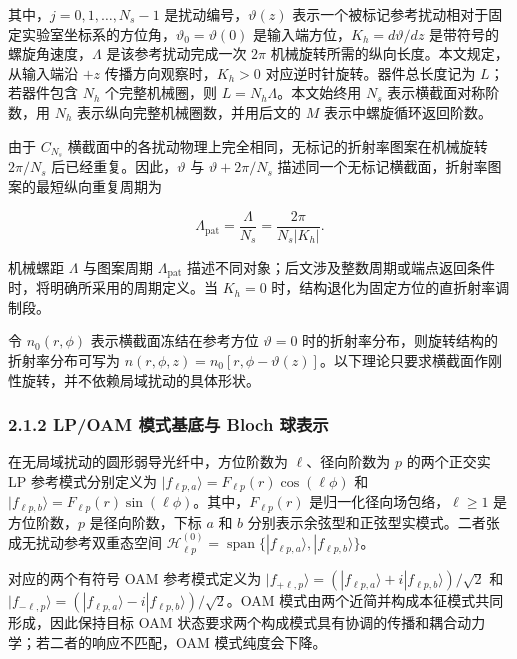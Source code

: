 \documentclass[
  UTF8,
  zihao=-4,
  fontset=fandol]{ctexart}
\begin{document}
其中，\(j=0,1,\ldots,N_s-1\) 是扰动编号，\(\vartheta(z)\)
表示一个被标记参考扰动相对于固定实验室坐标系的方位角，\(\vartheta_0=\vartheta(0)\)
是输入端方位，\(K_h=d\vartheta/dz\) 是带符号的螺旋角速度，\(\Lambda\)
是该参考扰动完成一次 \(2\pi\)
机械旋转所需的纵向长度。本文规定，从输入端沿 \(+z\)
传播方向观察时，\(K_h>0\) 对应逆时针旋转。器件总长度记为
\(L\)；若器件包含 \(N_h\) 个完整机械圈，则 \(L=N_h\Lambda\)。本文始终用
\(N_s\) 表示横截面对称阶数，用 \(N_h\) 表示纵向完整机械圈数，并用后文的
\(M\) 表示中螺旋循环返回阶数。

由于 \(C_{N_s}\)
横截面中的各扰动物理上完全相同，无标记的折射率图案在机械旋转
\(2\pi/N_s\) 后已经重复。因此，\(\vartheta\) 与 \(\vartheta+2\pi/N_s\)
描述同一个无标记横截面，折射率图案的最短纵向重复周期为

\[
\Lambda_{\mathrm{pat}}=\frac{\Lambda}{N_s}=\frac{2\pi}{N_s|K_h|}.
\]

机械螺距 \(\Lambda\) 与图案周期 \(\Lambda_{\mathrm{pat}}\)
描述不同对象；后文涉及整数周期或端点返回条件时，将明确所采用的周期定义。当
\(K_h=0\) 时，结构退化为固定方位的直折射率调制段。

令 \(n_0(r,\phi)\) 表示横截面冻结在参考方位 \(\vartheta=0\)
时的折射率分布，则旋转结构的折射率分布可写为
\(n(r,\phi,z)=n_0[r,\phi-\vartheta(z)]\)。以下理论只要求横截面作刚性旋转，并不依赖局域扰动的具体形状。

\hypertarget{lpoam-ux6a21ux5f0fux57faux5e95ux4e0e-bloch-ux7403ux8868ux793a}{%
\subsubsection{2.1.2 LP/OAM 模式基底与 Bloch
球表示}\label{lpoam-ux6a21ux5f0fux57faux5e95ux4e0e-bloch-ux7403ux8868ux793a}}

在无局域扰动的圆形弱导光纤中，方位阶数为 \(\ell\)、径向阶数为 \(p\)
的两个正交实 LP 参考模式分别定义为
\(|f_{\ell p,a}\rangle=F_{\ell p}(r)\cos(\ell\phi)\) 和
\(|f_{\ell p,b}\rangle=F_{\ell p}(r)\sin(\ell\phi)\)。其中，\(F_{\ell p}(r)\)
是归一化径向场包络，\(\ell\geq1\) 是方位阶数，\(p\) 是径向阶数，下标
\(a\) 和 \(b\)
分别表示余弦型和正弦型实模式。二者张成无扰动参考双重态空间
\(\mathcal H_{\ell p}^{(0)}=\operatorname{span}\{|f_{\ell p,a}\rangle,|f_{\ell p,b}\rangle\}\)。

对应的两个有符号 OAM 参考模式定义为
\(|f_{+\ell,p}\rangle=(|f_{\ell p,a}\rangle+i|f_{\ell p,b}\rangle)/\sqrt2\)
和
\(|f_{-\ell,p}\rangle=(|f_{\ell p,a}\rangle-i|f_{\ell p,b}\rangle)/\sqrt2\)。OAM
模式由两个近简并构成本征模式共同形成，因此保持目标 OAM
状态要求两个构成模式具有协调的传播和耦合动力学；若二者的响应不匹配，OAM
模式纯度会下降。
\end{document}
